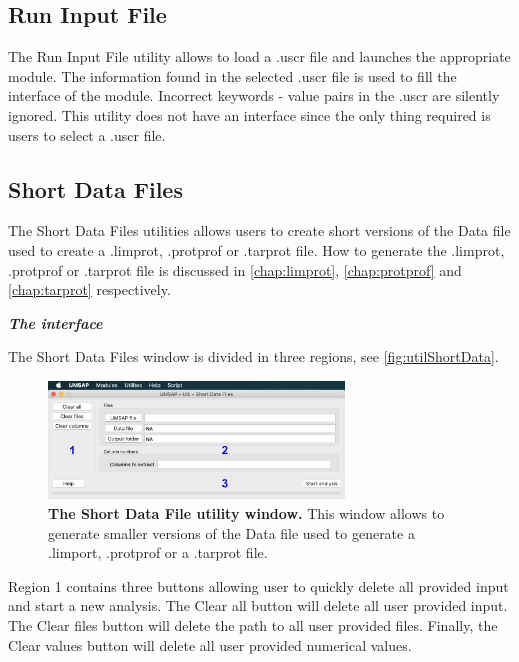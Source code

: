 \subsection{Run Input File}
\label{subsec:utilReadUscr}

The Run Input File utility allows to load a .uscr file and launches the appropriate module. The information found in the selected .uscr file is used to fill the interface of the module. Incorrect keywords - value pairs in the .uscr are silently ignored. This utility does not have an interface since the only thing required is users to select a .uscr file.

\subsection{Short Data Files}
\label{subsec:utilShortDF}

The Short Data Files utilities allows users to create short versions of the Data file used to create a .limprot, .protprof or .tarprot file. How to generate the .limprot, .protprof or .tarprot file is discussed in \autoref{chap:limprot}, \autoref{chap:protprof} and \autoref{chap:tarprot} respectively.

\textit{\textbf{The interface}}

The Short Data Files window is divided in three regions, see \autoref{fig:utilShortData}.

\begin{figure}[h]
	\centering
	\includegraphics[width=0.7\textwidth]{./IMAGES/UTIL-SHORTDF-WINDOW/util-shortdf.jpg}	    
	\caption[The Short Data File utility window]{\textbf{The Short Data File utility window.} This window allows to generate smaller versions of the Data file used to generate a .limport, .protprof or a .tarprot file.} 
	\label{fig:utilShortData}
	\vspace{-5pt} 	
\end{figure} 

Region \num{1} contains three buttons allowing user to quickly delete all provided input and start a new analysis. The Clear all button will delete all user provided input. The Clear files button will delete the path to all user provided files. Finally, the Clear values button will delete all user provided numerical values.

